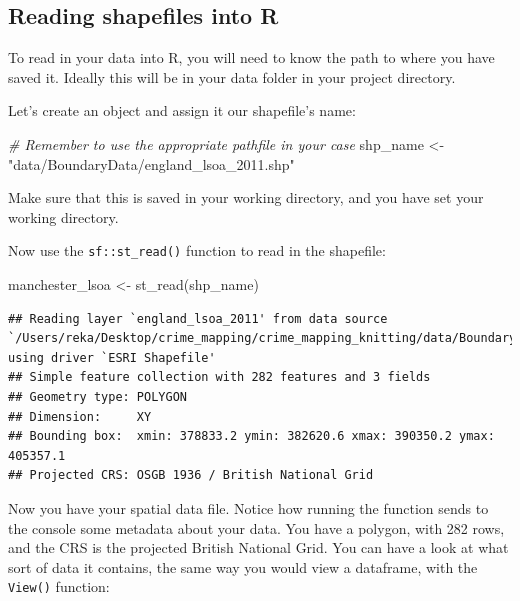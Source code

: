 \documentclass[
]{book}
\newenvironment{Shaded}{\begin{snugshade}}{\end{snugshade}}
\newcommand{\CommentTok}[1]{\textcolor[rgb]{0.56,0.35,0.01}{\textit{#1}}}
\newcommand{\FunctionTok}[1]{\textcolor[rgb]{0.00,0.00,0.00}{#1}}
\newcommand{\NormalTok}[1]{#1}
\newcommand{\OtherTok}[1]{\textcolor[rgb]{0.56,0.35,0.01}{#1}}
\newcommand{\StringTok}[1]{\textcolor[rgb]{0.31,0.60,0.02}{#1}}
\begin{document}
\hypertarget{reading-shapefiles-into-r}{%
\subsection{Reading shapefiles into R}\label{reading-shapefiles-into-r}}

To read in your data into R, you will need to know the path to where you have saved it. Ideally this will be in your data folder in your project directory.

Let's create an object and assign it our shapefile's name:

\begin{Shaded}
\begin{Highlighting}[]
\CommentTok{\# Remember to use the appropriate pathfile in your case}
\NormalTok{shp\_name }\OtherTok{\textless{}{-}} \StringTok{"data/BoundaryData/england\_lsoa\_2011.shp"}
\end{Highlighting}
\end{Shaded}

Make sure that this is saved in your working directory, and you have set your working directory.

Now use the \texttt{sf::st\_read()} function to read in the shapefile:

\begin{Shaded}
\begin{Highlighting}[]
\NormalTok{manchester\_lsoa }\OtherTok{\textless{}{-}} \FunctionTok{st\_read}\NormalTok{(shp\_name)}
\end{Highlighting}
\end{Shaded}

\begin{verbatim}
## Reading layer `england_lsoa_2011' from data source `/Users/reka/Desktop/crime_mapping/crime_mapping_knitting/data/BoundaryData/england_lsoa_2011.shp' using driver `ESRI Shapefile'
## Simple feature collection with 282 features and 3 fields
## Geometry type: POLYGON
## Dimension:     XY
## Bounding box:  xmin: 378833.2 ymin: 382620.6 xmax: 390350.2 ymax: 405357.1
## Projected CRS: OSGB 1936 / British National Grid
\end{verbatim}

Now you have your spatial data file. Notice how running the function sends to the console some metadata about your data. You have a polygon, with 282 rows, and the CRS is the projected British National Grid. You can have a look at what sort of data it contains, the same way you would view a dataframe, with the \texttt{View()} function:
\end{document}

